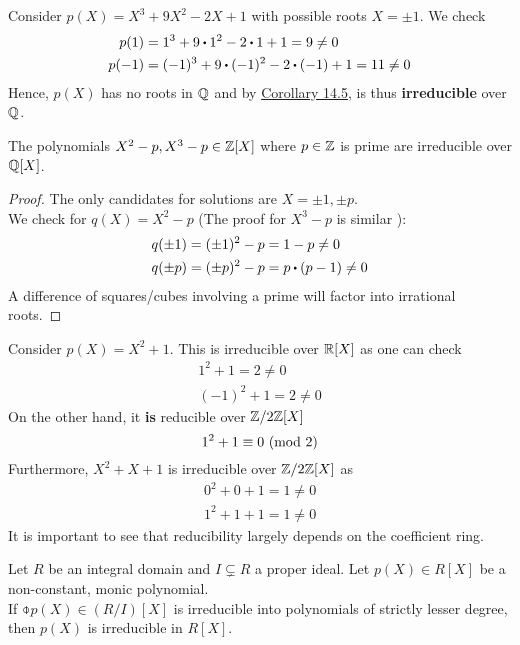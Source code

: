 \documentclass[../Main.tex]{subfiles}
\begin{document}
\begin{example}
	Consider $p(X) = X^3+9X^2-2X+1$ with possible roots $X=\pm 1$. We check
	\begin{align*}
	p(1)&=1^3+9\rdot 1^2-2\rdot 1+1=9\ne 0\\
	p(-1)&=(-1)^3+9\rdot (-1)^2-2\rdot (-1)+1 = 11 \ne 0 
	\end{align*}
	Hence, $p(X)$ has no roots in $\mathbb{Q}$ and by \hyperref[co:14.5]{Corollary 14.5}, is thus \textbf{irreducible} over $\mathbb{Q}$.
\end{example}
\begin{claim}
	The polynomials $X^2-p,X^3-p \in \mathbb{Z}[X]$ where $p\in \mathbb{Z}$ is prime are irreducible over $\mathbb{Q}[X]$.
\end{claim}
\begin{proof}
	The only candidates for solutions are $X=\pm 1, \pm p$. \\
	We check for $q(X)=X^2-p$ (The proof for $X^3-p$ is similar ):
	\begin{align*}
	&q(\pm 1) = (\pm 1)^2-p = 1-p \ne 0\\
	&q(\pm p) = (\pm p)^2-p = p\rdot (p-1)\ne 0 \qedhere
	\end{align*}
	A difference of squares/cubes involving a prime will factor into irrational roots.
\end{proof}
\begin{example}
	Consider $p(X)=X^2+1$. This is irreducible over $\mathbb{R}[X]$ as one can check
	\begin{align*}
	1^2+1=2 \ne 0\\
	(-1)^2+1=2\ne 0
	\end{align*}
	On the other hand, it \textbf{is} reducible over $\mathbb{Z}/2\mathbb{Z}[X]$ 
	\[1^2+1 \equiv 0 \ (\mathrm{mod}\ 2)\]
	Furthermore, $X^2+X+1$ is irreducible over $\mathbb{Z}/2\mathbb{Z}[X]$ as
	\begin{align*}
	0^2+0+1=1\ne 0\\
	1^2+1+1=1\ne 0
	\end{align*}
	It is important to see that reducibility largely depends on the coefficient ring.
\end{example}
\begin{prop}[title = If irreducible in \texorpdfstring{$(R/I)[X]$}{R/I[X]} then irreducible in \texorpdfstring{$R[X]$}{R[X]},label=14.7]
	Let $R$ be an integral domain and $I\subsetneq R$ a proper ideal. Let $p(X) \in R[X]$ be a non-constant, monic polynomial.\\
	If $\obar{p(X)} \in (R/I)[X]$ is irreducible into polynomials of strictly lesser degree, then $p(X)$ is irreducible in $R[X]$.
\end{prop}
\end{document}
